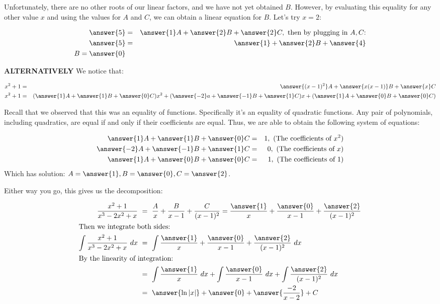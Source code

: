\documentclass{ximera}
\begin{document}
\begin{explanation}
Unfortunately, there are no other roots of our linear factors, and we have not yet obtained $B$.  However, by evaluating this equality for any other value $x$ and using the values for $A$ and $C$, we can obtain a linear equation for $B$.  Let's try $x=2$:

\begin{eqnarray*}
\answer{5}&=&\answer{1}A+\answer{2}B+\answer{2}C,\ \text{then by plugging in $A,C$:}\\
\answer{5}&=&\answer{1}+\answer{2}B+\answer{4}\\
B=\answer{0}
\end{eqnarray*}

\textbf{ALTERNATIVELY} We notice that:

\begin{eqnarray*}
x^2+1&=&\answer{(x-1)^2}A+\answer{x(x-1)}B+\answer{x}C\\
x^2+1&=&(\answer{1}A+\answer{1}B+\answer{0}C)x^2+(\answer{-2}a+\answer{-1}B+\answer{1}C)x+(\answer{1}A+\answer{0}B+\answer{0}C)
\end{eqnarray*}

Recall that we observed that this was an equality of functions.  Specifically it's an equality of quadratic functions.  Any pair of polynomials, including quadratics, are equal if and only if their coefficients are equal.  Thus, we are able to obtain the following system of equations:

\begin{eqnarray*}
\answer{1}A+\answer{1}B+\answer{0}C&=&1,\ \text{(The coefficients of $x^2$)}\\
\answer{-2}A+\answer{-1}B+\answer{1}C&=&0,\ \text{(The coefficients of $x$)}\\
\answer{1}A+\answer{0}B+\answer{0}C&=&1,\ \text{(The coefficients of $1$)}\\
\end{eqnarray*}
Which has solution: $A=\answer{1}, B=\answer{0}, C=\answer{2}$.

Either way you go, this gives us the decomposition:

\begin{align*}
\frac{x^2+1}{x^3-2x^2+x}&\ =\ \frac{A}{x}+\frac{B}{x-1}+\frac{C}{(x-1)^2}= \frac{\answer{1}}{x}+\frac{\answer{0}}{x-1}+\frac{\answer{2}}{(x-1)^2}\\
\intertext{Then we integrate both sides:}
\int \frac{x^2+1}{x^3-2x^2+x}\ dx &\ =\ \int \frac{\answer{1}}{x}+\frac{\answer{0}}{x-1}+\frac{\answer{2}}{(x-1)^2}\ dx\\
\intertext{By the linearity of integration:}
&\ =\ \int \frac{\answer{1}}{x}\ dx+\int \frac{\answer{0}}{x-1}\ dx+\int\frac{\answer{2}}{(x-1)^2}\ dx\\
&\ = \ \answer{\ln|x|}+\answer{0}+\answer{\frac{-2}{x-2}}+C
\end{align*}



\end{explanation}
\end{document}

